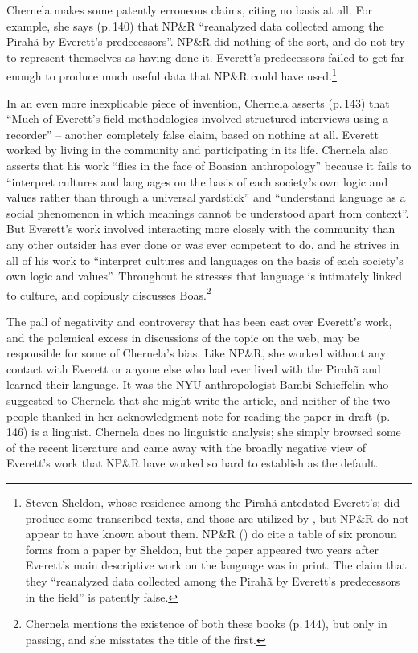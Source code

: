 \documentclass[output=paper,colorlinks,citecolor=brown
]{langscibook}
\begin{document}
Chernela makes some patently erroneous claims, citing no basis at all.
For example, she says (p.\,140) that NP\&R ``reanalyzed data collected
among the Pirah{\~a} by Everett's predecessors''. NP\&R did nothing of
the sort, and do not try to represent themselves as having done it.
Everett's predecessors failed to get far enough to produce much
useful data that NP\&R could have used.\footnote{%
   Steven Sheldon, whose residence among the Pirah{\~a} antedated
   Everett's; did produce some transcribed texts, and those are
   utilized by \citet{FutrellEtAl16}, but NP\&R do not appear to have
   known about them. NP\&R (\citeyear[391]{NevPesRod09a}) do cite a
   table of six pronoun forms from a paper by Sheldon, but the paper
   \citep{Sheldon88} appeared two years after Everett's main
   descriptive work on the language was in print. The claim that they
   ``reanalyzed data collected among the Pirah{\~a} by Everett's
   predecessors in the field'' is patently false.}

In an even more inexplicable piece of invention, Chernela asserts
(p.\,143) that ``Much of Everett's field methodologies involved
structured interviews using a recorder'' -- another completely false
claim, based on nothing at all. Everett worked by living in the
community and participating in its life. Chernela also asserts that
his work ``flies in the face of Boasian anthropology'' because it fails
to ``interpret cultures and languages on the basis of each society's
own logic and values rather than through a universal yardstick'' and
``understand language as a social phenomenon in which meanings cannot
be understood apart from context''. But Everett's work involved
interacting more closely with the community than any other outsider
has ever done or was ever competent to do, and he strives in all of
his work to ``interpret cultures and languages on the basis of each
society's own logic and values''. Throughout \citet{Everett12} he
stresses that language is intimately linked to culture, and
\citet{Everett16} copiously discusses Boas.\footnote{%
   Chernela mentions the existence of both these books (p.\,144), but
   only in passing, and she misstates the title of the first.}

The pall of negativity and controversy that has been cast over
Everett's work, and the polemical excess in discussions of the topic
on the web, may be responsible for some of Chernela's bias. Like
NP\&R, she worked without any contact with Everett or anyone else
who had ever lived with the Pirah{\~a} and learned their language.
It was the NYU anthropologist Bambi Schieffelin who suggested to
Chernela that she might write the article, and neither of the two
people thanked in her acknowledgment note for reading the paper in
draft (p.\,146) is a linguist. Chernela does no linguistic analysis;
she simply browsed some of the recent literature and came away with
the broadly negative view of Everett's work that NP\&R have worked
so hard to establish as the default.
\end{document}
